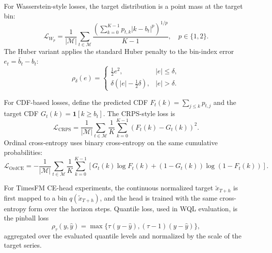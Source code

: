 \documentclass{article}
\begin{document}
For Wasserstein-style losses, the target distribution is a point mass at the
target bin:
\begin{equation}
    \mathcal{L}_{W_p}
    = \frac{1}{|\mathcal{M}|}\sum_{t\in\mathcal{M}}
      \frac{\left(\sum_{k=0}^{K-1}p_{t,k}|k-b_t|^p\right)^{1/p}}{K-1},
    \quad p\in\{1,2\}.
\end{equation}
The Huber variant applies the standard Huber penalty to the bin-index error
$e_t=\bar{b}_t-b_t$:
\begin{equation}
    \rho_\delta(e)=
    \begin{cases}
        \frac{1}{2}e^2, & |e|\leq \delta,\\
        \delta\left(|e|-\frac{1}{2}\delta\right), & |e|>\delta.
    \end{cases}
\end{equation}

For CDF-based losses, define the predicted CDF
$F_t(k)=\sum_{j\leq k}p_{t,j}$ and the target CDF
$G_t(k)=\mathbf{1}[k\geq b_t]$.  The CRPS-style loss is
\begin{equation}
    \mathcal{L}_{\mathrm{CRPS}}
    = \frac{1}{|\mathcal{M}|}\sum_{t\in\mathcal{M}}
      \frac{1}{K}\sum_{k=0}^{K-1}\left(F_t(k)-G_t(k)\right)^2 .
\end{equation}
Ordinal cross-entropy uses binary cross-entropy on the same cumulative
probabilities:
\begin{equation}
    \mathcal{L}_{\mathrm{OrdCE}}
    = -\frac{1}{|\mathcal{M}|}\sum_{t\in\mathcal{M}}\frac{1}{K}
      \sum_{k=0}^{K-1}
      \left[
        G_t(k)\log F_t(k)
        + (1-G_t(k))\log(1-F_t(k))
      \right].
\end{equation}

For TimesFM CE-head experiments, the continuous normalized target
$\tilde{x}_{T+h}$ is first mapped to a bin $q(\tilde{x}_{T+h})$, and the head is
trained with the same cross-entropy form over the horizon steps.  Quantile loss,
used in WQL evaluation, is the pinball loss
\begin{equation}
    \rho_\tau(y,\hat{y})
    = \max\{\tau(y-\hat{y}),(\tau-1)(y-\hat{y})\},
\end{equation}
aggregated over the evaluated quantile levels and normalized by the scale of the
target series.
\end{document}

